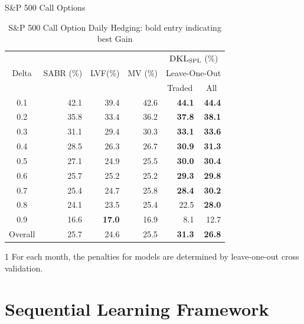 \documentclass[10pt,table,mathserif]{beamer}
\newcommand{\DKLs}{\bf\textsc{DKL}_{\text{SPL}}}
\newcommand{\LVF}{\textsc{LVF}}
\begin{document}
\begin{frame}{S\&P 500 Call Options}
\begin{table}[htp!]
\centering
\begin{threeparttable}
\begin{tabular}{|c |r r r r r|}
\hline
\multirow{3}{*}{Delta}&\multirow{3}{*}{SABR (\%)}&\multirow{3}{*}{\LVF\;(\%)}&\multirow{3}{*}{MV (\%)}&\multicolumn{2}{c|}{$\DKLs$ (\%)}\\
&&&&\multicolumn{2}{c|}{\small Leave-One-Out\tnote{1} }\\
&&&&\multicolumn{1}{c}{\small Traded}&\multicolumn{1}{c|}{\small All}\\ \hline
  0.1 & 42.1 & 39.4 & 42.6 & \textbf{44.1} & \textbf{44.4}  \\
  0.2 & 35.8 & 33.4 & 36.2 & \textbf{37.8} & \textbf{38.1} \\
  0.3 & 31.1 & 29.4 & 30.3 & \textbf{33.1} & \textbf{33.6} \\
  0.4 & 28.5 & 26.3 & 26.7 & \textbf{30.9} & \textbf{31.3}   \\
  0.5 & 27.1 & 24.9 & 25.5 & \textbf{30.0}& \textbf{30.4}  \\
  0.6 & 25.7 & 25.2 & 25.2 & \textbf{29.3}& \textbf{29.8}  \\
  0.7 & 25.4 & 24.7 & 25.8 & \textbf{28.4} & \textbf{30.2}  \\
  0.8 & 24.1 & 23.5 & 25.4&   22.5& \textbf{28.0}  \\
  0.9 & 16.6 & \textbf{17.0} & 16.9 & 8.1  & 12.7  \\
  Overall & 25.7 & 24.6 & 25.5 & \textbf{31.3} & \textbf{26.8}  \\
  \hline
\end{tabular}
\caption{S\&P 500 Call Option Daily Hedging: bold entry indicating best Gain}
\label{SP500Call}
  \begin{tablenotes}
    \small
  \item[1] For each month, the penalties for models are determined by leave-one-out cross validation.
\end{tablenotes}

\end{threeparttable}

\end{table}
\end{frame}


\section{Sequential Learning Framework}
\end{document}
